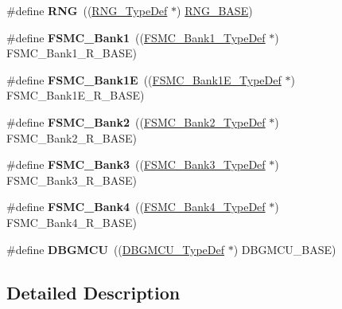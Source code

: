 \begin{DoxyCompactItemize}
\item 
\hypertarget{group___peripheral__declaration_ga5b0885b8b55bbc13691092b704d9309f}{\#define {\bfseries R\-N\-G}~((\hyperlink{struct_r_n_g___type_def}{R\-N\-G\-\_\-\-Type\-Def} $\ast$) \hyperlink{group___peripheral__memory__map_gab92662976cfe62457141e5b4f83d541c}{R\-N\-G\-\_\-\-B\-A\-S\-E})}\label{group___peripheral__declaration_ga5b0885b8b55bbc13691092b704d9309f}

\item 
\hypertarget{group___peripheral__declaration_ga2a759bad07fe730c99f9e1490e646220}{\#define {\bfseries F\-S\-M\-C\-\_\-\-Bank1}~((\hyperlink{struct_f_s_m_c___bank1___type_def}{F\-S\-M\-C\-\_\-\-Bank1\-\_\-\-Type\-Def} $\ast$) F\-S\-M\-C\-\_\-\-Bank1\-\_\-\-R\-\_\-\-B\-A\-S\-E)}\label{group___peripheral__declaration_ga2a759bad07fe730c99f9e1490e646220}

\item 
\hypertarget{group___peripheral__declaration_ga422986101f42a8811ae89ac69deb2759}{\#define {\bfseries F\-S\-M\-C\-\_\-\-Bank1\-E}~((\hyperlink{struct_f_s_m_c___bank1_e___type_def}{F\-S\-M\-C\-\_\-\-Bank1\-E\-\_\-\-Type\-Def} $\ast$) F\-S\-M\-C\-\_\-\-Bank1\-E\-\_\-\-R\-\_\-\-B\-A\-S\-E)}\label{group___peripheral__declaration_ga422986101f42a8811ae89ac69deb2759}

\item 
\hypertarget{group___peripheral__declaration_gabb3dfb5e88694aa2983ecabd33a55e0a}{\#define {\bfseries F\-S\-M\-C\-\_\-\-Bank2}~((\hyperlink{struct_f_s_m_c___bank2___type_def}{F\-S\-M\-C\-\_\-\-Bank2\-\_\-\-Type\-Def} $\ast$) F\-S\-M\-C\-\_\-\-Bank2\-\_\-\-R\-\_\-\-B\-A\-S\-E)}\label{group___peripheral__declaration_gabb3dfb5e88694aa2983ecabd33a55e0a}

\item 
\hypertarget{group___peripheral__declaration_ga411eedc00b5b2b22b494004d4f41b736}{\#define {\bfseries F\-S\-M\-C\-\_\-\-Bank3}~((\hyperlink{struct_f_s_m_c___bank3___type_def}{F\-S\-M\-C\-\_\-\-Bank3\-\_\-\-Type\-Def} $\ast$) F\-S\-M\-C\-\_\-\-Bank3\-\_\-\-R\-\_\-\-B\-A\-S\-E)}\label{group___peripheral__declaration_ga411eedc00b5b2b22b494004d4f41b736}

\item 
\hypertarget{group___peripheral__declaration_ga5aa00e4ac522693c6a21bc23ef5a96df}{\#define {\bfseries F\-S\-M\-C\-\_\-\-Bank4}~((\hyperlink{struct_f_s_m_c___bank4___type_def}{F\-S\-M\-C\-\_\-\-Bank4\-\_\-\-Type\-Def} $\ast$) F\-S\-M\-C\-\_\-\-Bank4\-\_\-\-R\-\_\-\-B\-A\-S\-E)}\label{group___peripheral__declaration_ga5aa00e4ac522693c6a21bc23ef5a96df}

\item 
\hypertarget{group___peripheral__declaration_ga92ec6d9ec2251fda7d4ce09748cd74b4}{\#define {\bfseries D\-B\-G\-M\-C\-U}~((\hyperlink{struct_d_b_g_m_c_u___type_def}{D\-B\-G\-M\-C\-U\-\_\-\-Type\-Def} $\ast$) D\-B\-G\-M\-C\-U\-\_\-\-B\-A\-S\-E)}\label{group___peripheral__declaration_ga92ec6d9ec2251fda7d4ce09748cd74b4}

\end{DoxyCompactItemize}


\subsection{Detailed Description}
